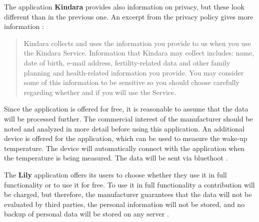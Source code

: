 The application \textbf{Kindara} provides also information on privacy, but these look different than in the previous one. An excerpt from the privacy policy gives more information \cite{kindara}:
\begin{quote}
	Kindara collects and uses the information you provide to us when you use the Kindara Service. Information that Kindara may collect includes: name, date of birth, e-mail address, fertility-related data and other family planning and health-related information you provide. You may consider some of this information to be sensitive so you should choose carefully regarding whether and if you will use the Service.
\end{quote}
Since the application is offered for free, it is reasonable to assume that the data will be processed further. The commercial interest of the manufacturer should be noted and analyzed in more detail before using this application.
An additional device is offered for the application, which can be used to measure the wake-up temperature. The device will automatically connect with the application when the temperature is being measured. The data will be sent via bluethoot \cite{kindara}.

The \textbf{Lily} application offers its users to choose whether they use it in full functionality or to use it for free.
To use it in full functionality a contribution will be charged, but therefore, the manufacturer guarantees that the data will not be evaluated by third parties, the personal information will not be stored, and no backup of personal data will be stored on any server \cite{lily}.

